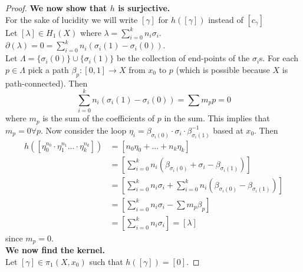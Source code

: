 \documentclass{article}
\begin{document}
\begin{proof}
\noindent \textbf{We now show that $h$ is surjective.}\\
For the sake of lucidity we will write $[\gamma]$ for $h([\gamma])$ instead of $[c_\gamma]$\\
Let $[\lambda]\in H_1(X)$ where $\lambda=\sum_{i=0}^k n_i\sigma_i$.
$\partial (\lambda)=0=\sum_{i=0}^k n_i(\sigma_i(1)-\sigma_i(0))$.\\
Let $\Lambda=\{\sigma_i(0)\}\cup\{\sigma_i(1)\}$ be the collection of end-points of the $\sigma_i$s.
For each $p\in\Lambda$ pick a path $\beta_p\colon [0,1]\to X$ from $x_0$ to $p$ (which is possible because $X$ is path-connected). Then \[\sum_{i=0}^k n_i(\sigma_i(1)-\sigma_i(0))=\sum m_pp=0\] where $m_p$ is the sum of the coefficients of $p$ in the sum. This implies that $m_p=0 \forall p$. Now consider the loop $\eta_i=\beta_{\sigma_i(0)}\cdot\sigma_i\cdot\beta_{\sigma_i(1)}^{-1}$ based at $x_0$. Then 
\begin{align*}
h([\eta_0^{n_0}\cdot\eta_1^{n_1}...\cdot\eta_k^{n_k}])&=[n_0\eta_0+...+n_k\eta_k]\\&=[\sum_{i=0}^kn_i(\beta_{\sigma_i(0)}+\sigma_i-\beta_{\sigma_i(1)})]\\&=[\sum_{i=0}^kn_i\sigma_i+\sum_{i=0}^kn_i(\beta_{\sigma_i(0)}-\beta_{\sigma_i(1)})]\\&=[\sum_{i=0}^kn_i\sigma_i-\sum m_p\beta_p]\\&=[\sum_{i=0}^kn_i\sigma_i]=[\lambda]
\end{align*}since $m_p=0$.\\
\noindent\textbf{We now find the kernel.}\\
Let $[\gamma]\in\pi_1(X,x_0)$ such that $h([\gamma])=[0]$.

\end{proof}
\end{document}
